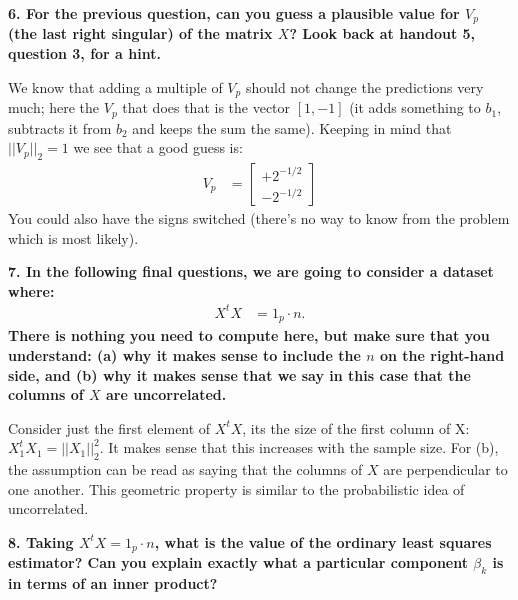 \documentclass[12pt,hidelinks]{article}
\numberwithin{equation}{section}
\begin{document}
\vspace*{12pt}

\textbf{6. For the previous question, can you guess a plausible value for $V_p$
(the last right singular) of the matrix $X$? Look back at handout 5, question 3,
for a hint.}

\vspace*{12pt}

We know that adding a multiple of $V_p$ should not change the predictions very
much; here the $V_p$ that does that is the vector $[1, -1]$ (it adds something
to $b_1$, subtracts it from $b_2$ and keeps the sum the same). Keeping in mind
that $|| V_p ||_2 = 1$ we see that a good guess is:
\begin{align}
V_p &= \begin{bmatrix} +2^{-1/2} \\ -2^{-1/2} \end{bmatrix}
\end{align}
You could also have the signs switched (there's no way to know from the problem
which is most likely).

\vspace*{12pt}

\textbf{7. In the following final questions, we are going to consider a dataset
where:}
\begin{align}
X^t X &= 1_p \cdot n.
\end{align}
\textbf{There is nothing you need to compute here, but make sure that you understand:
(a) why it makes sense to include the $n$ on the right-hand side, and (b) why
it makes sense that we say in this case that the columns of $X$ are uncorrelated.}

\vspace*{12pt}

Consider just the first element of $X^t X$, its the size of the first column of
X: $X_1^t X_1 = || X_1 ||_2^2$. It makes sense that this increases with the sample
size. For (b), the assumption can be read as saying that the columns of $X$ are
perpendicular to one another. This geometric property is similar to the probabilistic
idea of uncorrelated.

\vspace*{12pt}

\textbf{8. Taking $X^t X = 1_p \cdot n$, what is the value of the ordinary least
squares estimator? Can you explain exactly what a particular component $\beta_k$
is in terms of an inner product?}

\vspace*{12pt}
\end{document}
